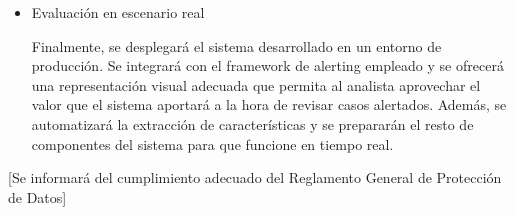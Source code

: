 \begin{itemize}
Una vez se cuente con una clasificación satisfactoria, se procederá a la siguiente fase, en la cual se pretende detectar anomalías en los datos.
En caso de contar con instancias que se hayan identificado como intrusiones mediante otros métodos, se usarán para probar la capacidad de detección del sistema.
Si, llegado el momento de hacer este testeo, no se dispone de este tipo de ejemplos, se elaborarán datos que representen distintas clases de anomalías con diversos grados de evidencia.
Dado que también se desea detectar otras clases de anomalías más genéricas (no solo relacionadas con seguridad), se incluirán casos como cambios de configuración o de equipos que hayan cambiado de rol en la red.

    \item Evaluación en escenario real

Finalmente, se desplegará el sistema desarrollado en un entorno de producción.
Se integrará con el framework de alerting empleado y se ofrecerá una representación visual adecuada que permita al analista aprovechar el valor que el sistema aportará a la hora de revisar casos alertados.
Además, se automatizará la extracción de características y se prepararán el resto de componentes del sistema para que funcione en tiempo real.

\end{itemize}

[Se informará del cumplimiento adecuado del Reglamento General de Protección de Datos]
